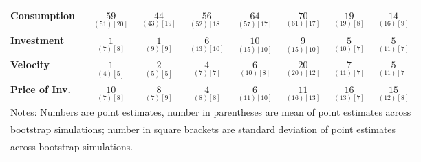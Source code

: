 \documentclass{article}
\begin{document}
\begin{tabular}{|l|c|@{}c|c|@{}c|c|@{}c|c|}
 \textbf{Consumption} & $\underset{( 51) [ 20]}{ 59}$ & $\underset{( 43) [ 19]}{ 44}$ & $\underset{( 52) [ 18]}{ 56}$ & $\underset{( 57) [ 17]}{ 64}$ & $\underset{( 61) [ 17]}{ 70}$ & $\underset{( 19) [  8]}{ 19}$ & $\underset{( 16) [  9]}{ 14}$ \\ \hline 
 \textbf{Investment} & $\underset{(  7) [  8]}{  1}$ & $\underset{(  9) [  9]}{  1}$ & $\underset{( 13) [ 10]}{  6}$ & $\underset{( 15) [ 10]}{ 10}$ & $\underset{( 15) [ 10]}{  9}$ & $\underset{( 10) [  7]}{  5}$ & $\underset{( 11) [  7]}{  5}$ \\ \hline 
 \textbf{Velocity} & $\underset{(  4) [  5]}{  1}$ & $\underset{(  5) [  5]}{  2}$ & $\underset{(  7) [  7]}{  4}$ & $\underset{( 10) [  8]}{  6}$ & $\underset{( 20) [ 12]}{ 20}$ & $\underset{( 11) [  7]}{  7}$ & $\underset{( 11) [  7]}{  5}$ \\ \hline 
 \textbf{Price of Inv.} & $\underset{(  7) [  8]}{ 10}$ & $\underset{(  7) [  9]}{  8}$ & $\underset{(  8) [  8]}{  4}$ & $\underset{( 11) [ 10]}{  6}$ & $\underset{( 16) [ 13]}{ 11}$ & $\underset{( 13) [  7]}{ 16}$ & $\underset{( 12) [  8]}{ 15}$ \\ \hline 
 \multicolumn{8}{|l|}{Notes: Numbers are point estimates, number in 
 parentheses are mean of point estimates across} \\ \hline 
 \multicolumn{8}{|l|}{bootstrap simulations; number in square brackets are 
 standard deviation of point estimates} \\ \hline 
 \multicolumn{8}{|l|}{across bootstrap simulations.} \\ \hline 
 \end{tabular} 
\end{document}
